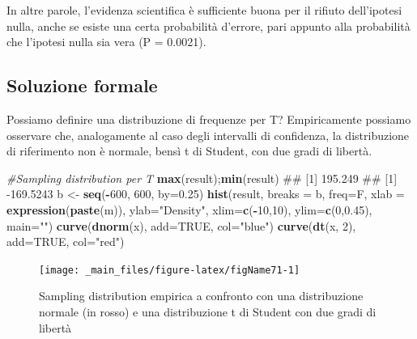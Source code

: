 \documentclass[a4paper,12pt,oneside]{book}
\newenvironment{Shaded}{\begin{snugshade}}{\end{snugshade}}
\newcommand{\KeywordTok}[1]{\textcolor[rgb]{0.13,0.29,0.53}{\textbf{#1}}}
\newcommand{\DataTypeTok}[1]{\textcolor[rgb]{0.13,0.29,0.53}{#1}}
\newcommand{\DecValTok}[1]{\textcolor[rgb]{0.00,0.00,0.81}{#1}}
\newcommand{\FloatTok}[1]{\textcolor[rgb]{0.00,0.00,0.81}{#1}}
\newcommand{\StringTok}[1]{\textcolor[rgb]{0.31,0.60,0.02}{#1}}
\newcommand{\CommentTok}[1]{\textcolor[rgb]{0.56,0.35,0.01}{\textit{#1}}}
\newcommand{\OtherTok}[1]{\textcolor[rgb]{0.56,0.35,0.01}{#1}}
\newcommand{\OperatorTok}[1]{\textcolor[rgb]{0.81,0.36,0.00}{\textbf{#1}}}
\newcommand{\NormalTok}[1]{#1}
\theoremstyle{definition}
\theoremstyle{definition}
\theoremstyle{definition}
\theoremstyle{remark}
\begin{document}
In altre parole, l'evidenza scientifica è sufficiente buona per il
rifiuto dell'ipotesi nulla, anche se esiste una certa probabilità
d'errore, pari appunto alla probabilità che l'ipotesi nulla sia vera (P
= 0.0021).

\subsection{Soluzione formale}\label{soluzione-formale}

Possiamo definire una distribuzione di frequenze per T? Empiricamente
possiamo osservare che, analogamente al caso degli intervalli di
confidenza, la distribuzione di riferimento non è normale, bensì t di
Student, con due gradi di libertà.

\begin{Shaded}
\begin{Highlighting}[]
\CommentTok{#Sampling distribution per T }
\KeywordTok{max}\NormalTok{(result);}\KeywordTok{min}\NormalTok{(result)}
\NormalTok{## [1] 195.249}
\NormalTok{## [1] -169.5243}
\NormalTok{b <-}\StringTok{ }\KeywordTok{seq}\NormalTok{(}\OperatorTok{-}\DecValTok{600}\NormalTok{, }\DecValTok{600}\NormalTok{, }\DataTypeTok{by=}\FloatTok{0.25}\NormalTok{)}
\KeywordTok{hist}\NormalTok{(result, }\DataTypeTok{breaks =}\NormalTok{ b, }\DataTypeTok{freq=}\NormalTok{F, }
  \DataTypeTok{xlab =} \KeywordTok{expression}\NormalTok{(}\KeywordTok{paste}\NormalTok{(m)), }\DataTypeTok{ylab=}\StringTok{"Density"}\NormalTok{, }
  \DataTypeTok{xlim=}\KeywordTok{c}\NormalTok{(}\OperatorTok{-}\DecValTok{10}\NormalTok{,}\DecValTok{10}\NormalTok{), }\DataTypeTok{ylim=}\KeywordTok{c}\NormalTok{(}\DecValTok{0}\NormalTok{,}\FloatTok{0.45}\NormalTok{), }\DataTypeTok{main=}\StringTok{""}\NormalTok{)}
\KeywordTok{curve}\NormalTok{(}\KeywordTok{dnorm}\NormalTok{(x), }\DataTypeTok{add=}\OtherTok{TRUE}\NormalTok{, }\DataTypeTok{col=}\StringTok{"blue"}\NormalTok{)}
\KeywordTok{curve}\NormalTok{(}\KeywordTok{dt}\NormalTok{(x, }\DecValTok{2}\NormalTok{), }\DataTypeTok{add=}\OtherTok{TRUE}\NormalTok{, }\DataTypeTok{col=}\StringTok{"red"}\NormalTok{)}
\end{Highlighting}
\end{Shaded}

\begin{figure}

{\centering \texttt{[image: \_main\_files/figure-latex/figName71-1]} 

}

\caption{Sampling distribution empirica a confronto con una distribuzione normale (in rosso) e una distribuzione t di Student con due gradi di libertà}\label{fig:figName71}
\end{figure}
\end{document}
